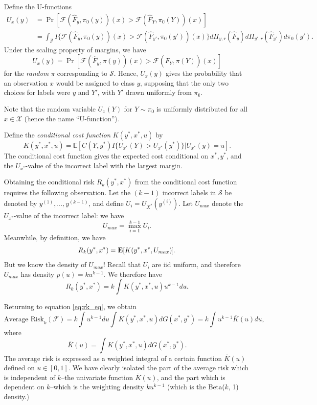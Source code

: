 \documentclass[12pt]{article}
\begin{document}
Define the U-functions
\begin{align}\label{eq:ufunc}
U_x(y) &= \Pr[\mathcal{F}(\hat{F}_y, \pi_0(y))(x) > \mathcal{F}(\hat{F}_Y, \pi_0(Y))(x)]
\\&= \int_{\mathcal{Y}} 
I\{
\mathcal{F}(\hat{F}_y, \pi_0(y))(x) > \mathcal{F}(\hat{F}_{y'}, \pi_0(y'))(x)
\}
d\Pi_{y, r}(\hat{F}_y)
d\Pi_{y', r}(\hat{F}_{y'})
d\pi_0(y').
\end{align}
Under the scaling property of margins, we have
\[
U_x(y) =  \Pr[\mathcal{F}(\hat{F}_y, \pi(y))(x) > \mathcal{F}(\hat{F}_Y, \pi(Y))(x)]
\]
for the \emph{random} $\pi$ corresponding to $\mathcal{S}$.  Hence,
$U_x(y)$ gives the probability that an observation $x$ would be
assigned to class $y$, supposing that the only two choices for labels
were $y$ and $Y'$, with $Y'$ drawn uniformly from $\pi_0$.

Note that the random variable $U_x(Y)$ for $Y \sim \pi_0$ is uniformly
distributed for all $x \in \mathcal{X}$ (hence the name ``U-function'').

Define the \emph{conditional cost function} $K(y^*, x^*, u)$ by
\begin{equation}\label{eq:Kfunc}
K(y^*, x^*, u) = \mathbb{E}[C(Y, y^*)I\{U_{x^*}(Y) > U_{x^*}(y^*)\}|U_{x^*}(y) = u].
\end{equation}
The conditional cost function gives the expected cost conditional on
$x^*, y^*$, and the $U_{x^*}$-value of the incorrect label with the
largest margin.

Obtaining the conditional risk $R_k(y^*, x^*)$ from the conditional
cost function requires the following observation.  Let the $(k-1)$
incorrect labels in $\mathcal{S}$ be denoted by $y^{(1)},\hdots,
y^{(k-1)}$, and define $U_i = U_{X^*}(y^{(i)})$. Let $U_{max}$ denote the $U_{x^*}$-value of
the incorrect label: we have
\[
U_{max} = \max_{i=1}^{k-1} U_i.
\]
Meanwhile, by definition, we have
\[
R_k(y^*, x^*) = \textbf{E}[K(y^*, x^*, U_{max})].
\]
But we know the density of $U_{max}$!  Recall that $U_i$ are iid
uniform, and therefore $U_{max}$ has density $p(u) = ku^{k-1}$.  We
therefore have
\[
R_k(y^*, x^*) = k \int K(y^*, x^*, u) u^{k-1} du.
\]

Returning to equation \eqref{eq:rk_eq}, we obtain
\[
\text{Average Risk}_k(\mathcal{F}) = k \int u^{k-1} du \int K(y^*, x^*, u) dG(x^*, y^*) = k \int u^{k-1} \bar{K}(u) du,
\]
where
\begin{equation}\label{eq:Kbar}
\bar{K}(u) = \int K(y^*, x^*, u) dG(x^*, y^*).
\end{equation}
The average risk is expressed as a weighted integral of a certain
function $\bar{K}(u)$ defined on $u \in [0,1]$.  We have clearly
isolated the part of the average risk which is independent of $k$--the
univariate function $\bar{K}(u)$, and the part which is dependent on
$k$--which is the weighting density $ku^{k-1}$ (which is the
Beta($k$, 1) density.)
\end{document}
